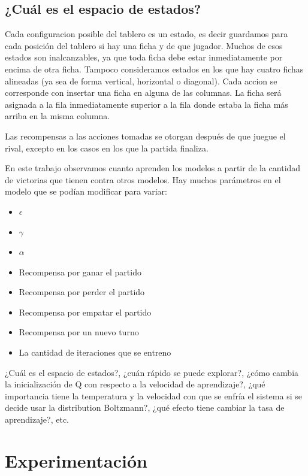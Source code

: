 \documentclass[10pt, a4paper]{article}
\begin{document}
\subsection{¿Cuál es el espacio de estados?}

Cada configuracion posible del tablero es un estado, es decir guardamos para cada posición del tablero si hay una ficha y de que jugador. Muchos de esos estados son inalcanzables, ya que toda ficha debe estar inmediatamente por encima de otra ficha. Tampoco consideramos estados en los que hay cuatro fichas alineadas (ya sea de forma vertical, horizontal o diagonal). 
Cada accion se corresponde con insertar una ficha en alguna de las columnas. La ficha será asignada a la fila inmediatamente superior a la fila donde estaba la ficha más arriba en la misma columna.

Las recompensas a las acciones tomadas se otorgan después de que juegue el rival, excepto en los casos en los que la partida finaliza.


En este trabajo observamos cuanto aprenden los modelos a partir de la cantidad de victorias que tienen contra otros modelos.
Hay muchos parámetros en el modelo que se podían modificar para variar:
\begin{itemize}
	\item $\epsilon$
	\item $\gamma$
	\item $\alpha$
	\item Recompensa por ganar el partido
	\item Recompensa por perder el partido
	\item Recompensa por empatar el partido
	\item Recompensa por un nuevo turno
	\item La cantidad de iteraciones que se entreno

\end{itemize}



¿Cuál es el espacio de estados?, ¿cuán rápido se puede explorar?, ¿cómo cambia la inicialización de Q con respecto a la velocidad de aprendizaje?, ¿qué importancia tiene la temperatura y la velocidad con que se enfría el sistema si se decide usar la distribution Boltzmann?, ¿qué efecto tiene cambiar la tasa de aprendizaje?, etc.

\section{Experimentación}
\end{document}

